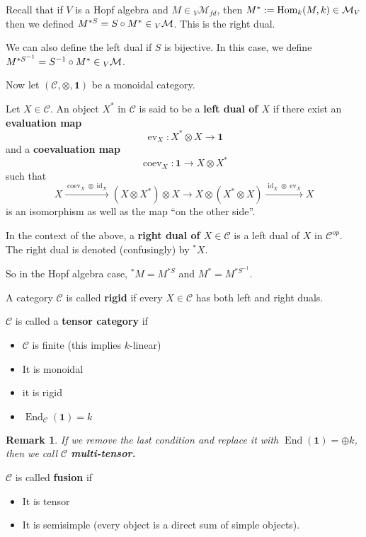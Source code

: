 \documentclass[12pt]{article}
\theoremstyle{break}
\theoremstyle{nonumberbreak}
\theoremstyle{changebreak}
\theoremstyle{break}
\theoremstyle{nonumberbreak}
\theoremstyle{nonumberplain}
\theoremstyle{change}
\newtheorem{rmk}[thm]{Remark}
\DeclareMathOperator{\id}{id}
\DeclareMathOperator{\End}{End}
\newcommand*{\Hom}{\ensuremath\text{Hom}}
\newcommand*{\calM}{\mathcal{M}}
\let\tilde\relax
\newcommand*{\tilde}[1]{\widetilde{#1}}
\begin{document}
Recall that if $V$ is a Hopf algebra and $M\in {_V\calM_{fd}}$, then $M^*:=\Hom_k(M,k)\in\calM_V$
then we defined $M^{*S}=\tilde S\circ M^*\in {_V\calM}$. This is the right dual.

We can also define the left dual if $S$ is bijective. In this case, we define $M^{*S^{-1}}=\tilde S^{-1}\circ M^*\in{_V\calM}$.

Now let $(\mathscr C,\otimes, \mathbf{1})$ be a monoidal category.
\begin{defn}
	Let $X\in\mathscr C$. An object $X^*$ in $\mathscr C$ is said to be a \textbf{left dual of $X$}
	if there exist an \textbf{evaluation map}
	\[\operatorname{ev}_X:X^*\otimes X\to \mathbf{1}\]
	and a \textbf{coevaluation map}
	\[\operatorname{coev}_X:\mathbf{1}\to X\otimes X^*\]
	such that
	\[X\xrightarrow{\operatorname{coev}_X\otimes\id_X}(X\otimes X^*)\otimes X\to X\otimes (X^*\otimes X)\xrightarrow{\id_X\otimes \operatorname{ev}_X} X\]
	is an isomorphism as well as the map ``on the other side''.
\end{defn}
\begin{defn}
	In the context of the above, a \textbf{right dual of $X\in\mathscr C$} is a left dual of $X$ in $\mathscr C^{op}$.
	The right dual is denoted (confusingly) by ${^*X}$.
\end{defn}
So in the Hopf algebra case, ${^*M}=M^{*S}$ and $M^*=M^{*S^{-1}}.$
\begin{defn}
	A category $\mathscr C$ is called \textbf{rigid} if every $X\in\mathscr C$ has both left and right duals.
\end{defn}
\begin{defn}
	$\mathscr C$ is called a \textbf{tensor category} if 
	\begin{itemize}
		\item $\mathscr C$ is finite (this implies $k$-linear)
		\item It is monoidal
		\item it is rigid
		\item $\End_\mathscr{C}(\mathbf{1})=k$
	\end{itemize}
\end{defn}
\begin{rmk}
	If we remove the last condition and replace it with $\End(\mathbf{1})=\oplus k$, then
	we call $\mathscr C$ \textbf{multi-tensor.}
\end{rmk}
\begin{defn}
	$\mathscr C$ is called \textbf{fusion} if 
	\begin{itemize}
		\item It is tensor
		\item It is semisimple (every object is a direct sum of simple objects).
	\end{itemize}
\end{defn}
\end{document}
